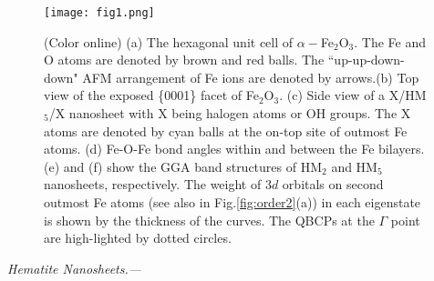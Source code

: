 \documentclass[twocolumn,english,prb,showpacs]{revtex4-1}
\begin{document}
\begin{figure}
\centering{}
\texttt{[image: fig1.png]}
\caption{ (Color online)
(a) The hexagonal unit cell of $\alpha-$Fe$_2$O$_3$. The Fe and O atoms are denoted by brown and red balls. The ``up-up-down-down" AFM arrangement of Fe ions are denoted by arrows.(b) Top view of the exposed \{0001\} facet of Fe$_2$O$_3$. (c) Side view of a X/HM$_5$/X nanosheet with X being halogen atoms or OH groups. The X atoms are denoted by cyan balls at the on-top site of outmost Fe atoms. (d) Fe-O-Fe bond angles within and between the Fe bilayers. (e) and (f) show the GGA band structures of HM$_2$ and HM$_5$ nanosheets, respectively. {The weight of 3$d$ orbitals on second outmost Fe atoms (see also in Fig.\ref{fig:order2}(a)) in each eigenstate is shown by the thickness of the curves.} The QBCPs at the $\Gamma$ point are high-lighted by dotted circles.
\label{fig:crystal}}
\end{figure}
\vspace{3mm}
\noindent\textit{Hematite Nanosheets.---}
\end{document}

